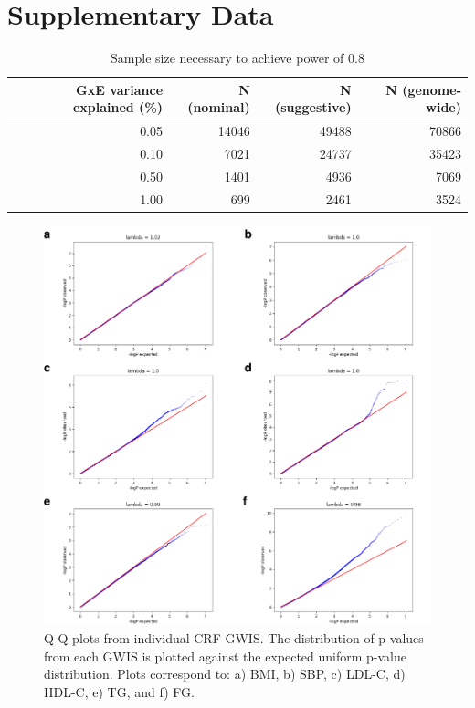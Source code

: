 \documentclass[]{article}
\begin{document}
\hypertarget{supplementary-data}{%
\section{Supplementary Data}\label{supplementary-data}}

\newcommand{\beginsupplement}{%
        \setcounter{table}{0}
        \renewcommand{\thetable}{S\arabic{table}}%
        \setcounter{figure}{0}
        \renewcommand{\thefigure}{S\arabic{figure}}%
     }
%
        \setcounter{table}{0}
        \renewcommand{\thetable}{S\arabic{table}}%
        \setcounter{figure}{0}
        \renewcommand{\thefigure}{S\arabic{figure}}%

\begin{longtable}{rrrr}
\caption{\label{tab:show-power-calcs}Sample size necessary to achieve power of 0.8}\\
\toprule
GxE variance explained (\%) & N (nominal) & N (suggestive) & N (genome-wide)\\
\midrule
0.05 & 14046 & 49488 & 70866\\
0.10 & 7021 & 24737 & 35423\\
0.50 & 1401 & 4936 & 7069\\
1.00 & 699 & 2461 & 3524\\
\bottomrule
\end{longtable}

\begin{figure}
\centering
\includegraphics{figures/show-qq-plots-1.pdf}
\caption{Q-Q plots from individual CRF GWIS. The distribution of
p-values from each GWIS is plotted against the expected uniform p-value
distribution. Plots correspond to: a) BMI, b) SBP, c) LDL-C, d) HDL-C,
e) TG, and f) FG.}
\end{figure}
\end{document}
